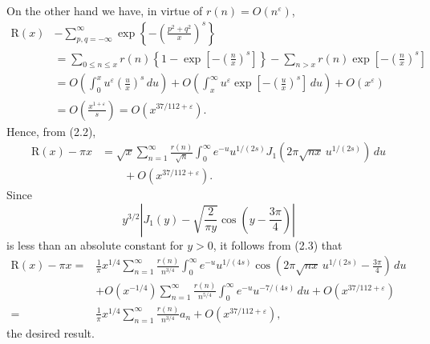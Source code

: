 \documentclass[11pt]{article}
\newcommand{\dd}{\,d}
\begin{document}
On the other hand we have, in virtue of $r(n)=O(n^\varepsilon)$,
\begin{align*}
\mathrm{R}(x)&-\sum_{p,q=-\infty}^{\infty}
 \exp\!\left\{-\left(\frac{p^2+q^2}{x}\right)^s\right\} \\
&=\sum_{0\leq n\leq x}r(n)
 \left\{1-\exp\!\left[-\left(\frac nx\right)^s\right]\right\}
 -\sum_{n>x}r(n)\exp\!\left[-\left(\frac nx\right)^s\right] \\
&=O\!\left(\int_0^x u^\varepsilon\left(\frac ux\right)^s\dd u\right)
 +O\!\left(\int_x^\infty u^\varepsilon
 \exp\!\left[-\left(\frac ux\right)^s\right]\dd u\right)
 +O\!\left(x^\varepsilon\right) \\
&=O\!\left(\frac{x^{1+\varepsilon}}s\right)
 =O\!\left(x^{37/112+\varepsilon}\right).
\end{align*}
Hence, from (2.2),
\begin{equation}
\begin{aligned}
 \mathrm{R}(x)-\pi x
 &=\sqrt{x}\sum_{n=1}^{\infty}\frac{r(n)}{\sqrt n}
 \int_0^\infty e^{-u}u^{1/(2s)}
 J_1\!\left(2\pi\sqrt{nx}\,u^{1/(2s)}\right)\dd u \\
 &\qquad+O\!\left(x^{37/112+\varepsilon}\right).
\end{aligned}
\tag{2.3}
\end{equation}
Since
\[
 y^{3/2}\left|J_1(y)-\sqrt{\frac{2}{\pi y}}
 \cos\!\left(y-\frac{3\pi}{4}\right)\right|
\]
is less than an absolute constant for $y>0$, it follows from (2.3) that
\begin{align*}
\mathrm{R}(x)-\pi x
={}&\frac1\pi x^{1/4}\sum_{n=1}^{\infty}\frac{r(n)}{n^{3/4}}
 \int_0^\infty e^{-u}u^{1/(4s)}
 \cos\!\left(2\pi\sqrt{nx}\,u^{1/(2s)}-\frac{3\pi}{4}\right)\dd u \\
&+O\!\left(x^{-1/4}\right)\sum_{n=1}^{\infty}\frac{r(n)}{n^{5/4}}
 \int_0^\infty e^{-u}u^{-7/(4s)}\dd u
 +O\!\left(x^{37/112+\varepsilon}\right) \\
={}&\frac1\pi x^{1/4}\sum_{n=1}^{\infty}\frac{r(n)}{n^{3/4}}a_n
 +O\!\left(x^{37/112+\varepsilon}\right),
\end{align*}
the desired result.
\end{document}
